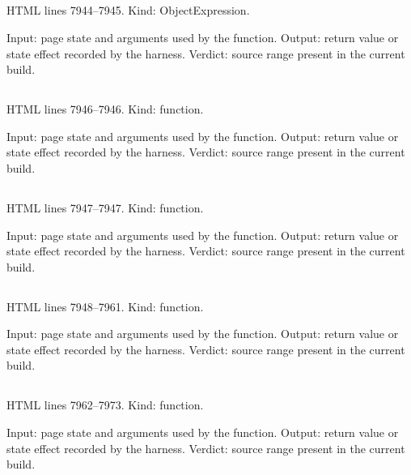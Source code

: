 \subsection*{\texttt{}}
\label{vf_412_APP_PHASE_TEXT}
HTML lines 7944--7945. Kind: ObjectExpression.

Input: page state and arguments used by the function.
Output: return value or state effect recorded by the harness.
Verdict: source range present in the current build.

\subsection*{\texttt{}}
\label{vf_413_appFmtMs}
HTML lines 7946--7946. Kind: function.

Input: page state and arguments used by the function.
Output: return value or state effect recorded by the harness.
Verdict: source range present in the current build.

\subsection*{\texttt{}}
\label{vf_414_appFmtMB}
HTML lines 7947--7947. Kind: function.

Input: page state and arguments used by the function.
Output: return value or state effect recorded by the harness.
Verdict: source range present in the current build.

\subsection*{\texttt{}}
\label{vf_415_appStatusSnapshot}
HTML lines 7948--7961. Kind: function.

Input: page state and arguments used by the function.
Output: return value or state effect recorded by the harness.
Verdict: source range present in the current build.

\subsection*{\texttt{}}
\label{vf_416_renderConsoleIdentity}
HTML lines 7962--7973. Kind: function.

Input: page state and arguments used by the function.
Output: return value or state effect recorded by the harness.
Verdict: source range present in the current build.

